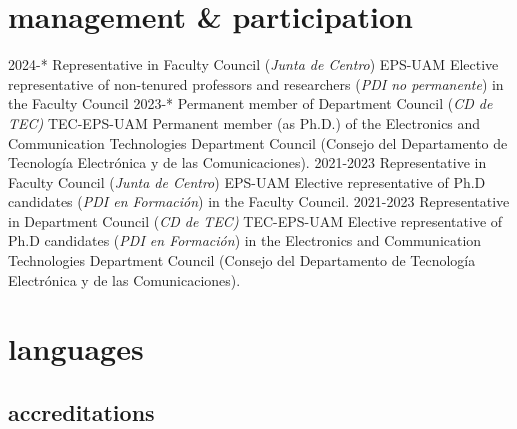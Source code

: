 \documentclass[]{friggeri-cv}
\begin{document}
\section{management \& participation}

\begin{entrylist}
\entry
    {2024-*}
    {Representative in Faculty Council (\textit{Junta de Centro})}
    {EPS-UAM}
    {Elective representative of non-tenured professors and researchers (\textit{PDI no permanente}) in the Faculty Council
    }
\entry
    {2023-*}
    {Permanent member of Department Council (\textit{CD de TEC)}}
    {TEC-EPS-UAM}
    {Permanent member (as Ph.D.) of the Electronics and Communication Technologies Department Council (Consejo del Departamento de Tecnología Electrónica y de las Comunicaciones).}
\entry
    {2021-2023}
    {Representative in Faculty Council (\textit{Junta de Centro})}
    {EPS-UAM}
    {Elective representative of Ph.D candidates (\textit{PDI en Formación}) in the Faculty Council.
    }
\entry
    {2021-2023}
    {Representative in Department Council (\textit{CD de TEC)}}
    {TEC-EPS-UAM}
    {Elective representative of Ph.D candidates (\textit{PDI en Formación}) in the Electronics and Communication Technologies Department Council (Consejo del Departamento de Tecnología Electrónica y de las Comunicaciones).}
\end{entrylist}
\vspace{-2em}
\section{languages}
\subsection{accreditations}
\end{document}
